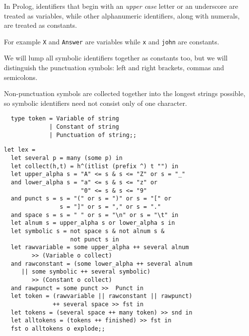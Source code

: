 \begin{slide*}


\vspace*{0.5cm}

In Prolog, identifiers that begin with an {\em upper case} letter or an
underscore are treated as variables, while other alphanumeric identifiers,
along with numerals, are treated as constants.

For example {\black \verb+X+} and {\black \verb+Answer+} are variables while
{\black \verb+x+} and {\black \verb+john+} are constants.

We will lump all symbolic identifiers together as constants too, but we will
distinguish the punctuation symbols: left and right brackets, commas and
semicolons.

Non-punctuation symbols are collected together into the longest strings
possible, so symbolic identifiers need not consist only of one character.

\begin{black}\begin{verbatim}
  type token = Variable of string
             | Constant of string
             | Punctuation of string;;
\end{verbatim}\end{black}

\end{slide*}



\begin{slide*}


\begin{black}\begin{footnotesize}\begin{verbatim}
let lex =
  let several p = many (some p) in
  let collect(h,t) = h^(itlist (prefix ^) t "") in
  let upper_alpha s = "A" <= s & s <= "Z" or s = "_"
  and lower_alpha s = "a" <= s & s <= "z" or
                      "0" <= s & s <= "9"
  and punct s = s = "(" or s = ")" or s = "[" or
                s = "]" or s = "," or s = "."
  and space s = s = " " or s = "\n" or s = "\t" in
  let alnum s = upper_alpha s or lower_alpha s in
  let symbolic s = not space s & not alnum s &
                   not punct s in
  let rawvariable = some upper_alpha ++ several alnum
        >> (Variable o collect)
  and rawconstant = (some lower_alpha ++ several alnum
     || some symbolic ++ several symbolic)
        >> (Constant o collect)
  and rawpunct = some punct >>  Punct in
  let token = (rawvariable || rawconstant || rawpunct)
              ++ several space >> fst in
  let tokens = (several space ++ many token) >> snd in
  let alltokens = (tokens ++ finished) >> fst in
  fst o alltokens o explode;;
\end{verbatim}\end{footnotesize}\end{black}

\end{slide*}



